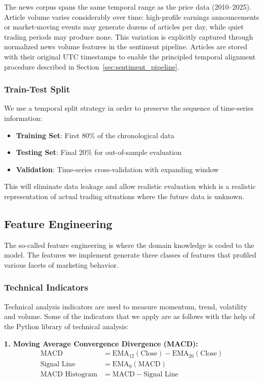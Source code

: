 \documentclass[12pt,a4paper]{article}
\begin{document}
The news corpus spans the same temporal range as the price data (2010--2025). Article volume varies considerably over time: high-profile earnings announcements or market-moving events may generate dozens of articles per day, while quiet trading periods may produce none. This variation is explicitly captured through normalized news volume features in the sentiment pipeline. Articles are stored with their original UTC timestamps to enable the principled temporal alignment procedure described in Section~\ref{sec:sentiment_pipeline}.

\subsubsection{Train-Test Split}

We use a temporal split strategy in order to preserve the sequence of time-series information:
\begin{itemize}
    \item \textbf{Training Set}: First 80\% of the chronological data
    \item \textbf{Testing Set}: Final 20\% for out-of-sample evaluation
    \item \textbf{Validation}: Time-series cross-validation with expanding window
\end{itemize}

This will eliminate data leakage and allow realistic evaluation which is a realistic representation of actual trading situations where the future data is unknown.

\subsection{Feature Engineering}

The so-called feature engineering is where the domain knowledge is coded to the model. The features we implement generate three classes of features that profiled various facets of marketing behavior.

\subsubsection{Technical Indicators}

Technical analysis indicators are used to measure momentum, trend, volatility and volume. Some of the indicators that we apply are as follows with the help of the Python library of technical analysis:

\textbf{1. Moving Average Convergence Divergence (MACD):}
\begin{align}
\text{MACD} &= \text{EMA}_{12}(\text{Close}) - \text{EMA}_{26}(\text{Close}) \\
\text{Signal Line} &= \text{EMA}_9(\text{MACD}) \\
\text{MACD Histogram} &= \text{MACD} - \text{Signal Line}
\end{align}
\end{document}
